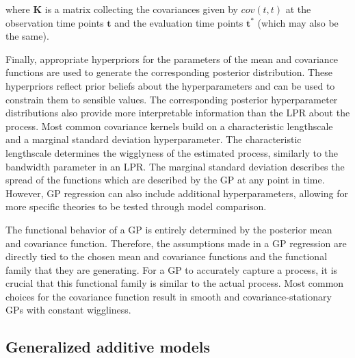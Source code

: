 \documentclass[jou, floatsintext]{apa7}
\begin{document}
\noindent where $\textbf{K}$ is a matrix collecting the covariances given by
$cov(t, t)$ at the observation time points $\textbf{t}$ and the evaluation time
points $\textbf{t}^*$ (which may also be the same).

Finally, appropriate hyperpriors for the parameters of the mean and covariance
functions are used to generate the corresponding posterior distribution. These
hyperpriors reflect prior beliefs about the hyperparameters and can be used to
constrain them to sensible values. The corresponding posterior hyperparameter
distributions also provide more interpretable information than the LPR about
the process. Most common covariance kernels build on a characteristic
lengthscale and a marginal standard deviation hyperparameter. The
characteristic lengthscale determines the wigglyness of the estimated process,
similarly to the bandwidth parameter in an LPR\@. The marginal standard
deviation describes the spread of the functions which are described by the GP
at any point in time. However, GP regression can also include additional
hyperparameters, allowing for more specific theories to be tested through model
comparison.

The functional behavior of a GP is entirely determined by the posterior mean
and covariance function. Therefore, the assumptions made in a GP regression are
directly tied to the chosen mean and covariance functions and the functional
family that they are generating. For a GP to accurately capture a process, it
is crucial that this functional family is similar to the actual process. Most
common choices for the covariance function result in smooth and
covariance-stationary GPs with constant wiggliness.

\subsection{Generalized additive models}
\end{document}
